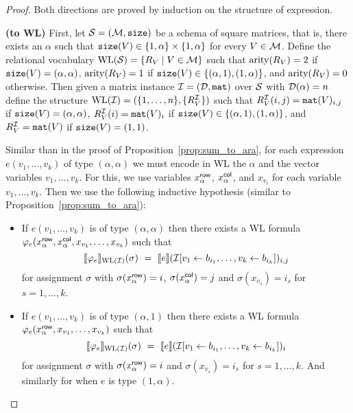 \begin{proof}
Both directions are proved by induction on the structure of expression.

\smallskip

\noindent \textbf{(\langprod to WL)} First, let $\mathcal{S}=(\mathcal{M},\texttt{size})$ be a schema of square matrices, that is, there exists an $\alpha$ such 
that $\texttt{size}(V) \in \{1, \alpha\} \times \{1,\alpha\}$ for every $V \in \mathcal{M}$.
Define the relational vocabulary $\text{WL}(\mathcal{S}) = \{R_V \mid V \in \mathcal{M}\}$ such that $\operatorname{arity}(R_V) = 2$ 
if $\texttt{size}(V) = (\alpha, \alpha)$, $\operatorname{arity}(R_V) = 1$ if $\texttt{size}(V) \in \{(\alpha,1), (1,\alpha)\}$, and 
$\operatorname{arity}(R_V) = 0$ otherwise.
Then given a matrix instance $\mathcal{I} = (\mathcal{D},\texttt{mat})$ over $\mathcal{S}$ with  $\mathcal{D}(\alpha) = n$ define the structure 
$\text{WL}(\mathcal{I}) = (\{1, \ldots, n\}, \{R_V^{\mathcal{I}}\} )$ such that 
$R_V^{\mathcal{I}}(i, j) = \texttt{mat}(V)_{i,j}$ if $\texttt{size}(V) = (\alpha, \alpha)$, $R_V^{\mathcal{I}}(i) = \texttt{mat}(V)_{i}$ 
if $\texttt{size}(V) \in \{(\alpha,1), (1,\alpha)\}$, and $R_V^{\mathcal{I}} = \texttt{mat}(V)$ if $\texttt{size}(V) = (1,1)$.

Similar than in the proof of Proposition~\ref{prop:sum_to_ara}, for each expression $e(v_1, \ldots, v_k)$ of type $(\alpha, \alpha)$ we must encode in WL the $\alpha$ and the vector variables $v_1, \ldots, v_k$. For this, we use variables $x_{\alpha}^{\mathsf{row}}$, $x_{\alpha}^{\mathsf{col}}$, and $x_{v_i}$ for each variable $v_1, \ldots, v_k$. Then we use the following inductive hypothesis (similar to Proposition~\ref{prop:sum_to_ara}):

\newcommand{\varphie}{\varphi_e}
\newcommand{\xr}{x_{\alpha}^\row}
\newcommand{\xc}{x_{\alpha}^\col}

\begin{itemize}
	\item If $e(v_1,\ldots,v_k)$ is of type $(\alpha,\alpha)$ then there exists a WL formula $\varphie(x_{\alpha}^\row,x_{\alpha}^\col, x_{v_1}, \ldots, x_{v_k})$ such that
	$$
	\ssem{\varphie}{\text{WL}(\I)}(\sigma) \ = \ \sem{e}{\I[v_1\gets b_{i_1},\ldots,v_k\gets b_{i_k}]}_{i,j}
	$$
	for assignment $\sigma$ with $\sigma(\xr)=i$, $\sigma(\xc)=j$ and $\sigma(x_{v_s})=i_s$ for $s=1,\ldots, k$.
	
	\item If $e(v_1,\ldots,v_k)$ is of type $(\alpha,1)$ then there exists a WL formula $\varphie(x_{\alpha}^\row, x_{v_1}, \ldots, x_{v_k})$ such that
	$$
	\ssem{\varphie}{\text{WL}(\I)}(\sigma) \ = \ \sem{e}{\I[v_1\gets b_{i_1},\ldots,v_k\gets b_{i_k}]}_{i}
	$$
	for assignment $\sigma$ with $\sigma(\xr)=i$ and $\sigma(x_{v_s})=i_s$ for $s=1,\ldots, k$.
	And similarly for when $e$ is type $(1,\alpha)$.
	

\end{itemize}
\end{proof}
